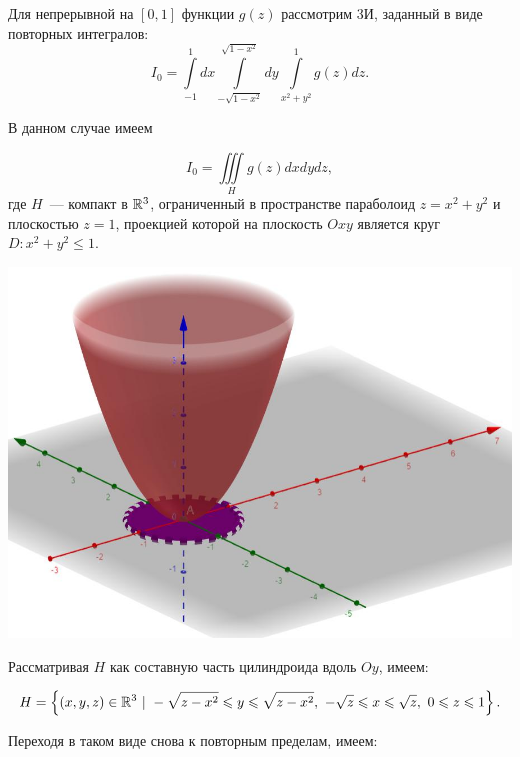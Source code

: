 \documentclass[../../main.tex]{subfiles}
\begin{document}
	\begin{example}
		Для непрерывной на $\left[0, 1\right]$ функции $g\left(z \right)$ рассмотрим 
		3И, заданный в виде повторных интегралов:
			\[I_0 = \int\limits_{-1}^1dx\int\limits_{-\sqrt{1 - x^2}}^{\sqrt{1 - 
			x^2}}dy\int\limits_{x^2 + y^2}^1 g\left(z\right)dz.\]
		
		В данном случае имеем
		
		\[I_0 = \iiint\limits_{H} g(z) dxdydz,\]
		где $H$~--- компакт в $\mathbb{R}^3$, ограниченный в пространстве параболоид $z = 
		x^2 + 
		y^2$ и плоскостью $z = 1$, проекцией которой на плоскость $Oxy$ является 
		круг $D: x^2 + y^2 \leq 1$.
		
		\begin{center}
		\includegraphics[scale = 0.7]{lec14.jpg}
		\end{center}
		
		Рассматривая $H$ как составную часть цилиндроида вдоль $Oy$, имеем:
		
		\[H = \left\{\left(x, y, z\right) \in \mathbb{R}^3 \ |\ -\sqrt{z - x^2} \leqslant y 
		\leqslant \sqrt{z - x^2},\ -\sqrt{z} \leqslant x \leqslant \sqrt{z},\ 0 \leqslant z \leqslant 1 
		\right\}.\]
		
		Переходя в таком виде снова к повторным пределам, имеем:
		

\end{example}
\end{document}
